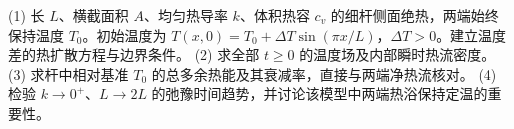 (1) 长 \(L\)、横截面积 \(A\)、均匀热导率 \(k\)、体积热容 \(c_v\) 的细杆侧面绝热，两端始终保持温度 \(T_0\)。初始温度为 \(T(x,0)=T_0+\Delta T\sin(\pi x/L)\)，\(\Delta T>0\)。建立温度差的热扩散方程与边界条件。
(2) 求全部 \(t\ge0\) 的温度场及内部瞬时热流密度。
(3) 求杆中相对基准 \(T_0\) 的总多余热能及其衰减率，直接与两端净热流核对。
(4) 检验 \(k\to0^+\)、\(L\to2L\) 的弛豫时间趋势，并讨论该模型中两端热浴保持定温的重要性。
